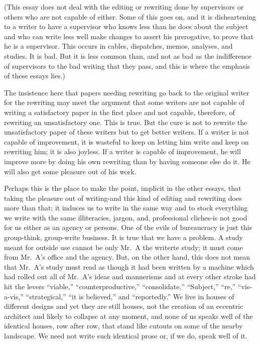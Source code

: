 \documentclass[
    oneside,
    11pt,
    draft
]{memoir}
\begin{document}
(This essay does not deal with the editing or rewriting done by supervisors or others who are not capable of either. Some of this goes on, and it is disheartening to a writer to have a supervisor who knows less than he does about the subject and who can write less well make changes to assert his prerogative, to prove that he is a supervisor. This occurs in cables, dispatches, memos, analyses, and studies. It is bad. But it is less common than, and not as bad as the indifference of supervisors to the bad writing that they pass, and this is where the emphasis of these essays lies.) 

The insistence here that papers needing rewriting go back to the original writer for the rewriting may meet the argument that some writers are not capable of writing a satisfactory paper in the first place and not capable, therefore, of rewriting an unsatisfactory one. This is true. But the cure is not to rewrite the unsatisfactory paper of these writers but to get better writers. If a writer is not capable of improvement, it is wasteful to keep on letting him write and keep on rewriting him; it is also joyless. If a writer is capable of improvement, he will improve more by doing his own rewriting than by having someone else do it. He will also get some pleasure out of his work.

Perhaps this is the place to make the point, implicit in the other essays, that taking the pleasure out of writing-and this kind of editing and rewriting does more than that; it induces us to write in the same way and to stock everything we write with the same illiteracies, jargon, and, professional cliches-is not good for us either as an agency or persons. One of the evils of bureaucracy is just this group-think, group-write business. It is true that we have a problem. A study meant for outside use cannot be only Mr.\ A the writerte study; it must come from Mr.\ A's office and the agency. But, on the other hand, this does not mean that Mr.\ A's study must read as though it had been written by a machine which had rolled out all of Mr.\ A's ideas and mannerisms and at every other stroke had hit the levers \enquote{viable,} \enquote{counterproductive,} \enquote{consolidate,} \enquote{Subject,} \enquote{re,} \enquote{vis-a-vis,} \enquote{strategical,} \enquote{it is believed,} and \enquote{reportedly.} We live in houses of different designs and yet they are still houses, not the creation of an eccentric architect and likely to collapse at any moment, and none of us speaks well of the identical houses, row after row, that stand like cutouts on some of the nearby landscape. We need not write such identical prose or, if we do, speak well of it.
\end{document}
